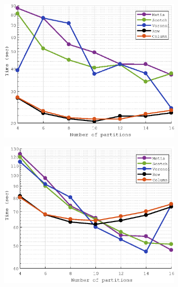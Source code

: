 \documentclass[a4paper,11pt]{article}
\begin{document}
\begin{figure}[H]\ContinuedFloat
	\begin{subfigure}[t]{0.45\textwidth}
		\centering
		\includegraphics[width=\textwidth]{robin_400x400_10_time.eps}
	\end{subfigure}
	\hfill
	\begin{subfigure}[t]{0.45\textwidth}
		\centering
		\includegraphics[width=\textwidth]{dirichlet_400x400_10_time.eps}
	\end{subfigure}
\end{figure}
\end{document}
